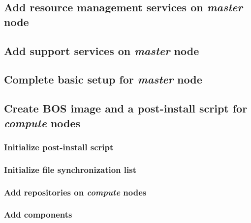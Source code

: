 \documentclass[letterpaper]{article}
\begin{document}
\subsection{Add resource management services on {\em master} node} \label{sec:add_rm}


\subsection{Add \InfiniBand{} support services on {\em master} node} \label{sec:add_ofed}


\vspace*{-0.15cm}
\subsection{Complete basic \xCAT{} setup for {\em master} node} \label{sec:setup_xcat}



\subsection{Create BOS image and a post-install script for {\em compute} nodes}


\subsubsection{Initialize post-install script} \label{sec:init_script}


\subsubsection{Initialize file synchronization list} \label{sec:init_synclist}


\subsubsection{Add repositories on {\em compute} nodes}
\label{sec:script_add_repos}


\subsubsection{Add \OHPC{} components} \label{sec:add_components}

\end{document}
